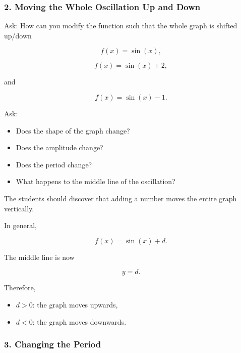 \documentclass[a4paper,11pt]{article}
\begin{document}
\subsubsection*{2. Moving the Whole Oscillation Up and Down}

Ask: How can you modify the function such that the whole graph is shifted up/down

\begin{equation}
    f(x)=\sin(x),
\end{equation}

\begin{equation}
    f(x)=\sin(x)+2,
\end{equation}

and

\begin{equation}
    f(x)=\sin(x)-1.
\end{equation}

Ask:

\begin{itemize}
    \item Does the shape of the graph change?
    \item Does the amplitude change?
    \item Does the period change?
    \item What happens to the middle line of the oscillation?
\end{itemize}

The students should discover that adding a number moves the entire
graph vertically.

In general,

\begin{equation}
    f(x)=\sin(x)+d.
\end{equation}

The middle line is now

\begin{equation}
    \boxed{y=d}.
\end{equation}

Therefore,

\begin{itemize}
    \item $d>0$: the graph moves upwards,
    \item $d<0$: the graph moves downwards.
\end{itemize}


\subsubsection*{3. Changing the Period}
\end{document}
